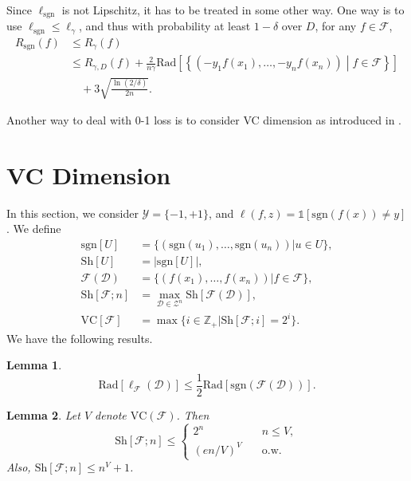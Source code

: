 \documentclass[openany]{book}
\newtheorem{lemma}{Lemma}[chapter]
\theoremstyle{definition}
\theoremstyle{remark}
\begin{document}
Since $\ell_{\mathrm{sgn}}$ is not Lipschitz, it has to be treated in some other way. One way is to use $\ell_{\mathrm{sgn}}\le\ell_{\gamma}$, and thus with probability at least $1-\delta$ over $D$, for any $f\in \mathcal{F}$,
\begin{align*}
    R_{\mathrm{sgn}}(f) & \le R_{\gamma}(f) \\
     & \le R_{\gamma,D}(f)+\frac{2}{n\gamma}\mathrm{Rad}\left[\left\{(-y_1f(x_1),\ldots,-y_nf(x_n))\middle|f\in \mathcal{F}\right\}\right] \\
     & \quad+3\sqrt{\frac{\ln(2/\delta)}{2n}}.
\end{align*}

Another way to deal with 0-1 loss is to consider VC dimension as introduced in .

\section{VC Dimension}\label{sec:VCDim}
In this section, we consider $\mathcal{Y}=\{-1,+1\}$, and $\ell(f,z)=\mathds{1}[\mathrm{sgn}(f(x))\ne y]$. We define
\begin{align*}
    \mathrm{sgn}[U] & =\{(\mathrm{sgn}(u_1),\ldots,\mathrm{sgn}(u_n))|u\in U\}, \\
    \mathrm{Sh}[U] & =|\mathrm{sgn}[U]|, \\
    \mathcal{F}(\mathcal{D}) & =\{(f(x_1),\ldots,f(x_n))|f\in \mathcal{F}\}, \\
    \mathrm{Sh}[\mathcal{F};n] & =\max_{\mathcal{D}\in \mathcal{Z}^n}\mathrm{Sh}[\mathcal{F}(\mathcal{D})], \\
    \mathrm{VC}[\mathcal{F}] & =\max\{i\in \mathbb{Z}_+|\mathrm{Sh}[\mathcal{F};i]=2^i\}.
\end{align*}
We have the following results.
\begin{lemma}
    \begin{equation*}
        \mathrm{Rad}[\ell_{\mathcal{F}}(\mathcal{D})]\le \frac{1}{2}\mathrm{Rad}[\mathrm{sgn}(\mathcal{F}(\mathcal{D}))].
    \end{equation*}
\end{lemma}
\begin{lemma}
    Let $V$ denote $\mathrm{VC}(\mathcal{F})$. Then
    \begin{equation*}
        \mathrm{Sh}[\mathcal{F};n]\le\left\{
        \begin{array}{ll}
            2^n & \quad n\le V, \\
            (en/V)^V & \quad\textrm{o.w.}
        \end{array}
        \right.
    \end{equation*}
    Also, $\mathrm{Sh}[\mathcal{F};n]\le n^V+1$.
\end{lemma}
\end{document}

